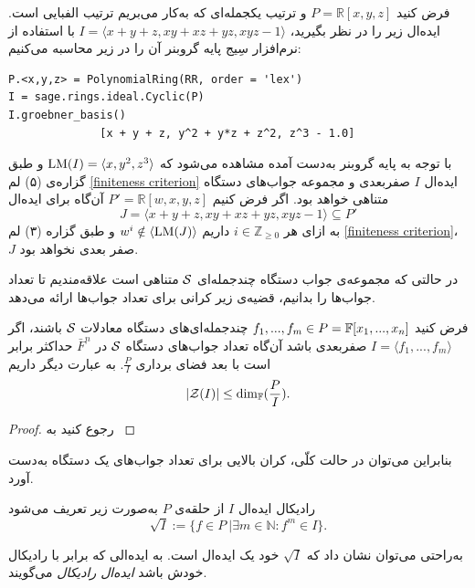 \begin{example}
	فرض کنید
	$P = \mathbb{R}[x,y,z]$
	و ترتیب یکجمله‌ای که به‌کار  می‌بریم ترتیب الفبایی است.  ایده‌ال زیر را در نظر بگیرید،
	$I = \langle x + y + z, xy + xz + yz, xyz - 1 \rangle$
	با استفاده از نرم‌افزار سِیج پایه‌  گروبنر آن را در زیر محاسبه می‌کنیم:
\begin{latin}
\begin{lstlisting}
P.<x,y,z> = PolynomialRing(RR, order = 'lex')
I = sage.rings.ideal.Cyclic(P)
I.groebner_basis()
              [x + y + z, y^2 + y*z + z^2, z^3 - 1.0]
\end{lstlisting}
\end{latin}

	
	با توجه به پایه‌  گروبنر به‌دست  آمده مشاهده می‌شود که 
	$\operatorname{\mathrm{LM}}(I) = \langle x, y^{2}, z^{3}\rangle$
	و طبق گزاره‌ی (۵) لم
	\ref{finiteness criterion}
	ایده‌ال 
	$I$
	صفربعدی و مجموعه‌  جواب‌های دستگاه متناهی خواهد بود. اگر فرض کنیم 
	$P' = \mathbb{R}[w,x,y,z]$
	آن‌گاه برای ایده‌ال 
	$$J = \langle x + y + z, xy + xz + yz, xyz - 1 \rangle\subseteq P'$$
	به ازای هر 
	$i\in\mathbb{Z}_{\geq0}$
	داریم 
	$w^{i}\notin \langle\operatorname{\mathrm{LM}}(J)\rangle$
	و طبق گزاره (۳)
	لم
	\ref{finiteness criterion}،
	$J$
	صفر بعدی نخواهد بود. 
\end{example}
در حالتی که مجموعه‌ی جواب دستگاه چندجمله‌ای
${\mathcal S}$
متناهی است علاقه‌مندیم تا تعداد جواب‌ها را بدانیم، قضیه‌ی زیر کرانی برای تعداد جواب‌ها ارائه می‌دهد.
\begin{theorem}
	فرض کنید 
	$f_{1},...,f_{m}\in P = \mathbb{F}[x_{1},...,x_{n}]$
	چندجمله‌ای‌های دستگاه معادلات 
	${\mathcal S}$
	باشند، اگر 
	$I = \langle f_{1},...,f_{m}\rangle$
	صفربعدی باشد آن‌گاه تعداد جواب‌های دستگاه 
	${\mathcal S}$
	در 
	$\bar{F}^{n}$
	حداکثر برابر است با بعد فضای برداری 
	$\frac{P}{I}$.
	به عبارت دیگر داریم
	$$|{\mathcal Z}(I)|\leq\dim_{\mathbb{F}}(\frac{P}{I}).$$
\end{theorem}
\begin{proof}
	رجوع کنید به 
	\cite[ص.۲۴۵]{cca1_kreuzer}
\end{proof}
بنابراین می‌توان در حالت کلّی، کران بالایی برای تعداد جواب‌های یک دستگاه به‌دست  آورد.
\begin{definition}
	رادیکال ایده‌ال 
	$I$
	از حلقه‌ی 
	$P$
	به‌صورت زیر تعریف می‌شود
	$$\sqrt{I}:=\{f\in P \ | \exi m\in\mathbb{N}: f^{m}\in I \}.$$
\end{definition}
به‌راحتی می‌توان نشان داد که 
$\sqrt{I}$
خود یک ایده‌ال است. به ایده‌الی که برابر با رادیکال خودش باشد
\textit{ ایده‌ال رادیکال\textit{}}
می‌گویند.

